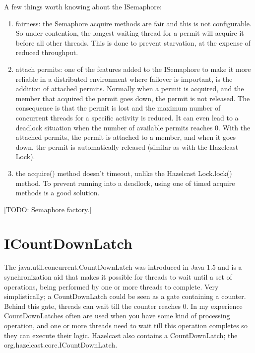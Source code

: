 A few things worth knowing about the ISemaphore:
\begin{enumerate}
\item fairness: the Semaphore acquire methods are fair and this is not configurable. So under contention, the longest waiting thread for a permit will acquire it before all other threads. This is done to prevent starvation, at the expense of reduced throughput.
\item attach permits: one of the features added to the ISemaphore to make it more reliable in a distributed environment where failover is important, is the addition of attached permits. Normally when a permit is acquired, and the member that acquired the permit goes down, the permit is not released. The consequence is that the permit is lost and the maximum number of concurrent threads for a specific activity is reduced. It can even lead to a deadlock situation when the number of available permits reaches 0. With the attached permits, the permit is attached to a member, and when it goes down, the permit is automatically released (similar as with the Hazelcast Lock).
\item the acquire() method doesn't timeout, unlike the Hazelcast Lock.lock() method. To prevent running into a deadlock, using one of timed acquire methods is a good solution.
\end{enumerate}

[TODO: Semaphore factory.]

\section{ICountDownLatch}
The java.util.concurrent.CountDownLatch was introduced in Java 1.5 and is a synchronization aid that makes it possible for threads to wait until a set of operations, being performed by one or more threads to complete. Very simplistically; a CountDownLatch could be seen as a gate containing a counter. Behind this gate, threads can wait till the counter reaches 0. In my experience CountDownLatches often are used when you have some kind of processing operation, and one or more threads need to wait till this operation completes so they can execute their logic. Hazelcast also contains a CountDownLatch; the org.hazelcast.core.ICountDownLatch.

